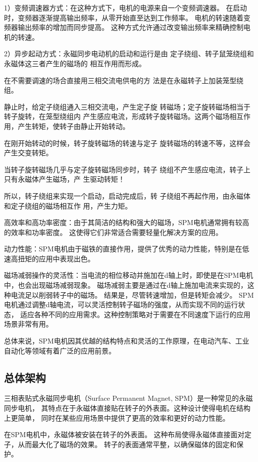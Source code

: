 \documentclass{thuemp}
\begin{document}
1）变频调速器方式：在这种方式下，电机的电源来自一个变频调速器。
在启动时，变频器逐渐提高输出频率，从零开始直至达到工作频率。
电机的转速随着变频器输出频率的增加而同步提高。
这种方式允许通过改变输出频率来精确控制电机的转速。

2）异步起动方式：永磁同步电动机的启动和运行是由
定子绕组、转子鼠笼绕组和永磁体这三者产生的磁场的
相互作用而形成。

在不需要调速的场合直接用三相交流电供电的方
法是在永磁转子上加装笼型绕组。

静止时，给定子绕组通入三相交流电，产生定子旋
转磁场；定子旋转磁场相当于转子旋转，在笼型绕组内
产生感应电流，形成转子旋转磁场。这两个磁场相互作
用，产生转矩，使转子由静止开始转动。

在刚开始转动的时候，转子旋转磁场的转速与定子
旋转磁场的转速不等，这样会产生交变转矩。

当转子旋转磁场几乎与定子旋转磁场同步时，转子
绕组不产生感应电流，转子上只有永磁体产生磁场，产
生驱动转矩！

所以，转子绕组来实现一个启动，启动完成后，转
子绕组不再起作用，由永磁体和定子绕组的磁场相互作
用，产生力矩。

高效率和高功率密度：由于其简洁的结构和强大的磁场，SPM电机通常拥有较高的效率和功率密度。
这使得它们非常适合需要轻量化解决方案的应用。

动力性能：SPM电机由于磁铁的直接作用，提供了优秀的动力性能，特别是在低速高扭矩的应用中表现出色。

磁场减弱操作的灵活性：当电流的相位移动并施加在d轴上时，即使是在SPM电机中，也会出现磁场减弱现象。
磁场减弱主要是通过在d轴上施加电流来实现的，这种电流足以削弱转子中的磁场。
结果是，尽管转速增加，但是转矩会减少。
SPM电机通过调整d轴电流，可以灵活控制转子磁场的强度，从而实现不同的运行状态，
适应各种不同的应用需求。这种控制策略对于需要在不同速度下运行的应用场景非常有用。

总体来说，SPM电机因其优越的结构特点和灵活的工作原理，在电动汽车、工业自动化等领域有着广泛的应用前景。

\subsection{总体架构}
三相表贴式永磁同步电机（Surface Permanent Magnet, SPM）是一种常见的永磁同步电机，
其特点在于永磁体直接贴在转子的外表面。这种设计使得电机在结构上更简单，
同时在某些应用场景中提供了更高的效率和更好的动力性能。

在SPM电机中，永磁体被安装在转子的外表面。
这种布局使得永磁体直接面对定子，从而最大化了磁场的效果。
转子的表面通常平整，以确保磁体的固定和保护。
\end{document}
